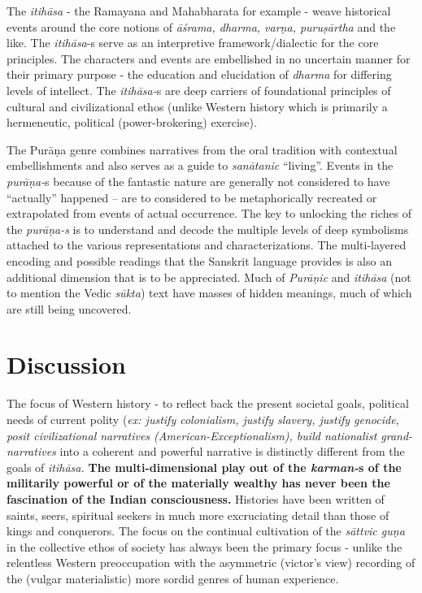 The \textit{itihāsa} - the Ramayana and Mahabharata for example - weave historical events around the core notions of \textit{āśrama, dharma, varṇa, puruṣārtha} and the like. The \textit{itihāsa}-s serve as an interpretive framework/dialectic for the core principles. The characters and events are embellished in no uncertain manner for their primary purpose - the education and elucidation of \textit{dharma} for differing levels of intellect. The \textit{itihāsa-}s are deep carriers of foundational principles of cultural and civilizational ethos (unlike Western history which is primarily a hermeneutic, political (power-brokering) exercise).

The Purāṇa genre combines narratives from the oral tradition with contextual embellishments and also serves as a guide to \textit{sanātanic} “living”. Events in the \textit{purāṇa-}s because of the fantastic nature are generally not considered to have “actually” happened – are to considered to be metaphorically recreated or extrapolated from events of actual occurrence. The key to unlocking the riches of the \textit{purāṇa-s} is to understand and decode the multiple levels of deep symbolisms attached to the various representations and characterizations. The multi-layered encoding and possible readings that the Sanskrit language provides is also an additional dimension that is to be appreciated. Much of \textit{Purāṇic} and \textit{itihāsa} (not to mention the Vedic \textit{sūkta}) text have masses of hidden meanings, much of which are still being uncovered.


\section*{Discussion}

The focus of Western history - to reflect back the present societal goals, political needs of current polity (\textit{ex: justify colonialism, justify slavery, justify genocide, posit civilizational narratives (American-Exceptionalism), build nationalist grand-narratives} into a coherent and powerful narrative is distinctly different from the goals of \textit{itihāsa.} \textbf{The multi-dimensional play out of the \textit{karman-}s of the militarily powerful or of the materially wealthy has never been the fascination of the Indian consciousness.} Histories have been written of saints, seers, spiritual seekers in much more excruciating detail than those of kings and conquerors. The focus on the continual cultivation of the \textit{sāttvic guṇa} in the collective ethos of society has always been the primary focus - unlike the relentless Western preoccupation with the asymmetric (victor’s view) recording of the (vulgar materialistic) more sordid genres of human experience.


